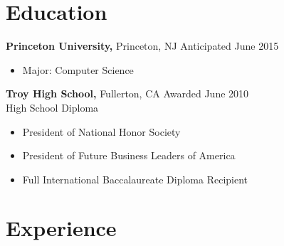 \documentclass[margin]{res}
\begin{document}

\address{{\bf Present Address} \\ 3169 Frist Center \\ Princeton, NJ
  08544 \\ http://dskang.com \\ dan@dskang.com }

\address{{\bf Permanent Address} \\ 2507 Cypress Point Drive \\
  Fullerton, CA 92833 }


\begin{resume}

\section{Education}
 {\bf Princeton University,} Princeton, NJ \hfill Anticipated June
 2015
 \begin{itemize} \itemsep -2pt %
 \item Major: Computer Science
 \end{itemize}

 {\bf Troy High School,} Fullerton, CA \hfill Awarded June 2010 \\
 High School Diploma
 \begin{itemize} \itemsep -2pt %
 \item President of National Honor Society
 \item President of Future Business Leaders of America
 \item Full International Baccalaureate Diploma Recipient
 \end{itemize}

\section{Experience}


\end{resume}
\end{document}
